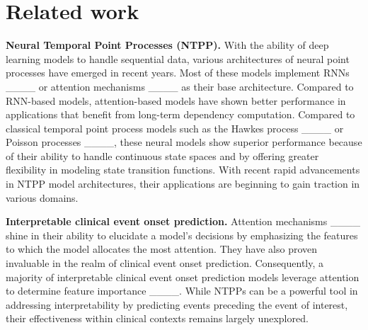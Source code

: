 \section{Related work}
\textbf{Neural Temporal Point Processes (NTPP).} With the ability of deep learning models to handle sequential data, various architectures of neural point processes have emerged in recent years. Most of these models implement RNNs ____ or attention mechanisms ____ as their base architecture. Compared to RNN-based models, attention-based models have shown better performance in applications that benefit from long-term dependency computation. Compared to classical temporal point process models such as the Hawkes process ____ or Poisson processes ____, these neural models show superior performance because of their ability to handle continuous state spaces and by offering greater flexibility in modeling state transition functions. With recent rapid advancements in NTPP model architectures, their applications are beginning to gain traction in various domains.

\vspace{10pt}

\noindent\textbf{Interpretable clinical event onset prediction.} Attention mechanisms ____ shine in their ability to elucidate a model's decisions by emphasizing the features to which the model allocates the most attention. They have also proven invaluable in the realm of clinical event onset prediction. Consequently, a majority of interpretable clinical event onset prediction models leverage attention to determine feature importance ____. While NTPPs can be a powerful tool in addressing interpretability by predicting events preceding the event of interest, their effectiveness within clinical contexts remains largely unexplored.